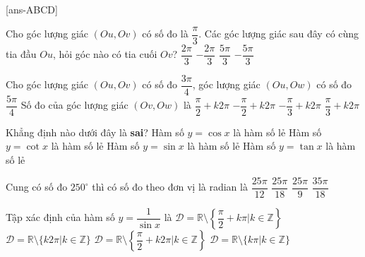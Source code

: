 \caulc

[ans-ABCD]

\begin{ex}%
	Cho góc lượng giác $(Ou,Ov)$ có số đo là $\dfrac{\pi}{3}$. Các góc lượng giác sau đây có cùng tia đầu $Ou$, hỏi góc nào có tia cuối $Ov$?
	\choice
	{$\dfrac{2\pi}{3}$}
	{$-\dfrac{2\pi}{3}$}
	{$\dfrac{5\pi}{3}$}
	{\True $-\dfrac{5\pi}{3}$}
\end{ex}
\begin{ex}%
	Cho góc lượng giác $(Ou,Ov)$ có số đo $\dfrac{3\pi}{4}$, góc lượng giác $(Ou,Ow)$ có số đo $\dfrac{5\pi}{4}$ Số đo của góc lượng giác $(Ov,Ow)$ là
	\choice
	{\True $\dfrac{\pi}{2}+k2\pi$}
	{$-\dfrac{\pi}{2}+k2\pi$}
	{$-\dfrac{\pi}{3}+k2\pi$}
	{$\dfrac{\pi}{3}+k2\pi$}
\end{ex}

\begin{ex}%
	Khẳng định nào dưới đây là \textbf{sai}?
	\choice
	{\True Hàm số $y=\cos x$ là hàm số lẻ}
	{Hàm số $y=\cot x$ là hàm số lẻ}
	{Hàm số $y=\sin x$ là hàm số lẻ}
	{Hàm số $y=\tan x$ là hàm số lẻ}
\end{ex}


\begin{ex}%
	Cung có số đo $250^\circ$ thì có số đo theo đơn vị là radian là
	\choice
	{$\dfrac{25\pi}{12}$}
	{\True $\dfrac{25\pi}{18}$}
	{$\dfrac{25\pi}{9}$}
	{$\dfrac{35\pi}{18}$}
\end{ex}
\begin{ex}%
	Tập xác định của hàm số $y=\dfrac{1}{\sin x}$ là
	\choice
	{$\mathscr{D}=\mathbb{R}\setminus\left\{\dfrac{\pi}{2}+k\pi|k\in\mathbb{Z}\right\}$}
	{$\mathscr{D}=\mathbb{R}\setminus\{k2\pi|k\in\mathbb{Z}\}$}
	{$\mathscr{D}=\mathbb{R}\setminus\left\{\dfrac{\pi}{2}+k2\pi|k\in\mathbb{Z}\right\}$}
	{\True $\mathscr{D}=\mathbb{R}\setminus\{k\pi|k\in\mathbb{Z}\}$}
\end{ex}


